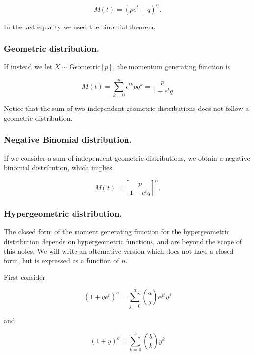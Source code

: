 \documentclass[12pt]{article}
\begin{document}
\begin{equation}
M(t) = ( p e^{t} + q )^{n}.
\end{equation}

\noindent
In the last equality we used the binomial theorem.

\subsubsection{Geometric distribution.}

If instead we let $X \sim \text{Geometric}[p]$, the 
momentum generating function is 

\begin{equation}
M(t) = \sum_{k = 0}^{\infty} e^{tk} p q^{k} = \frac{p}{1 - e^{t} q}
\end{equation}

\noindent
Notice that the sum of two independent geometric distributions does not 
follow a geometric distribution. 

\subsubsection{Negative Binomial distribution.}
 
If we consider a sum of independent geometric distributions, we obtain
a negative binomial distribution, which implies

\begin{equation}
M(t) = \left[ \frac{p}{1 - e^{t} q} \right]^{n}.
\end{equation}


\subsubsection{Hypergeometric distribution.}

The closed form of the moment generating function for the hypergeometric distribution 
depends on hypergeometric functions, and are beyond the scope of this notes.
We will write an alternative version which does not have a closed form, but is
expressed as a function of $n$.

First consider

\begin{equation}
( 1 + y e^{t} )^{a} = \sum_{j = 0}^{a} {a \choose j} e^{jt} y^{j}
\end{equation}

\noindent
and 

\begin{equation}
( 1 + y )^{b} = \sum_{k = 0}^{b} {b \choose k} y^{k}
\end{equation}
\end{document}

